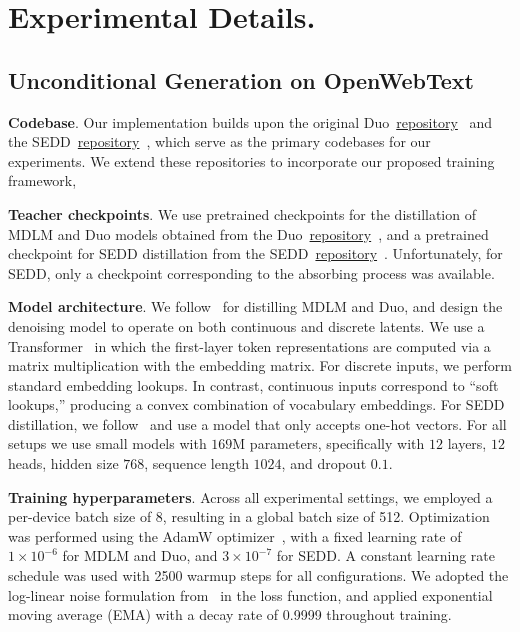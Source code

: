 \section{Experimental Details.}
\label{app: experimental details}

\subsection{Unconditional Generation on OpenWebText}
\label{app:owt-experimental-details}

\noindent \textbf{Codebase}. Our implementation builds upon the original Duo~\href{https://github.com/s-sahoo/duo}{repository}~\citep{sahoo2025the} and the SEDD~\href{https://github.com/louaaron/Score-Entropy-Discrete-Diffusion}{repository}~\citep{lou2024discrete}, which serve as the primary codebases for our experiments. We extend these repositories to incorporate our proposed training framework, 

\noindent \textbf{Teacher checkpoints}. We use pretrained checkpoints for the distillation of MDLM and Duo models obtained from the Duo~\href{https://github.com/s-sahoo/duo}{repository}~\citep{sahoo2025the}, and a pretrained checkpoint for SEDD distillation from the SEDD~\href{https://github.com/louaaron/Score-Entropy-Discrete-Diffusion}{repository}~\citep{lou2024discrete}. Unfortunately, for SEDD, only a checkpoint corresponding to the absorbing process was available.

\noindent \textbf{Model architecture}. We follow~\citep{sahoo2025the} for distilling MDLM and Duo, and design the denoising model to operate on both continuous and discrete latents. We use a Transformer~\citep{vaswani2017attention} in which the first-layer token representations are computed via a matrix multiplication with the embedding matrix. For discrete inputs, we perform standard embedding lookups. In contrast, continuous inputs correspond to “soft lookups,” producing a convex combination of vocabulary embeddings. For SEDD distillation, we follow~\citep{lou2024discrete} and use a model that only accepts one-hot vectors. For all setups we use small models with $169$M parameters, specifically with $12$ layers, $12$ heads, hidden size $768$, sequence length $1024$, and dropout $0.1$.

\noindent \textbf{Training hyperparameters}.  
Across all experimental settings, we employed a per-device batch size of 8, resulting in a global batch size of 512. Optimization was performed using the AdamW optimizer~\citep{loshchilov2017decoupled}, with a fixed learning rate of $1 \times 10^{-6}$ for MDLM and Duo, and $3 \times 10^{-7}$ for SEDD. A constant learning rate schedule was used with 2500 warmup steps for all configurations. We adopted the log-linear noise formulation from~\citep{lou2024discrete} in the loss function, and applied exponential moving average (EMA) with a decay rate of 0.9999 throughout training.


